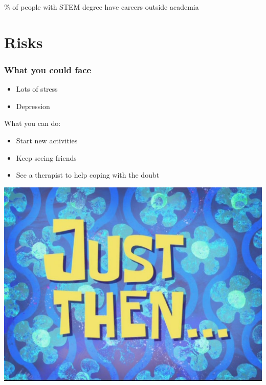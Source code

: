 \documentclass[]{beamer}
\begin{document}
\begin{frame}
\% of people with STEM degree have careers outside academia
\end{frame}

\section{Risks}
\begin{frame}
\frametitle{What you could face}
\begin{itemize}
\item Lots of stress
\item Depression
\end{itemize}\pause
What you can do:
\begin{itemize}
\item Start new activities
\item Keep seeing friends
\item See a therapist to help coping with the doubt
\end{itemize}
\end{frame}

\begin{frame}
\centering
\includegraphics[width=\textwidth]{just_then}
\end{frame}
\end{document}
